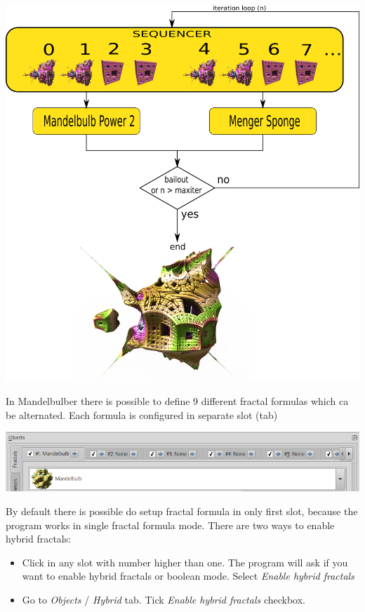 \includegraphics[width=\linewidth]{img/manual/media/iteration_loop_hybrid.png}

In Mandelbulber there is possible to define 9 different fractal formulas which ca be alternated. Each formula is configured in separate slot (tab)

\includegraphics[width=\linewidth]{img/manual/media/fractal_tabs.png}

By default there is possible do setup fractal formula in only first slot, because the program works in single fractal formula mode. There are two ways to enable hybrid fractals:
\begin{itemize}
	\item Click in any slot with number higher than one. The program will ask if you want to enable hybrid fractals or boolean mode. Select \emph{Enable hybrid fractals}
	\item Go to \emph{Objects} / \emph{Hybrid} tab. Tick \emph{Enable hybrid fractals} checkbox.
\end{itemize}

